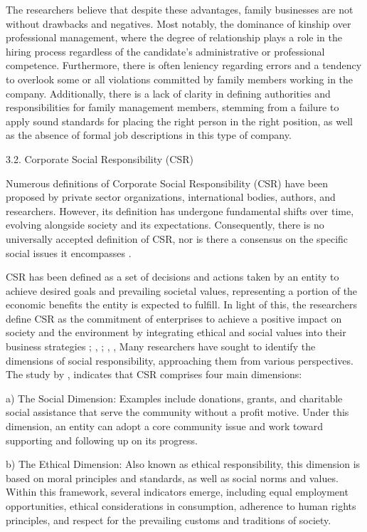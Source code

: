 \documentclass[10pt]{NSP1}
\begin{document}
The researchers believe that despite these advantages, family businesses are not without drawbacks and negatives. Most notably, the dominance of kinship over professional management, where the degree of relationship plays a role in the hiring process regardless of the candidate’s administrative or professional competence. Furthermore, there is often leniency regarding errors and a tendency to overlook some or all violations committed by family members working in the company. Additionally, there is a lack of clarity in defining authorities and responsibilities for family management members, stemming from a failure to apply sound standards for placing the right person in the right position, as well as the absence of formal job descriptions in this type of company.

3.2. Corporate Social Responsibility (CSR)

Numerous definitions of Corporate Social Responsibility (CSR) have been proposed by private sector organizations, international bodies, authors, and researchers. However, its definition has undergone fundamental shifts over time, evolving alongside society and its expectations. Consequently, there is no universally accepted definition of CSR, nor is there a consensus on the specific social issues it encompasses \cite{ref5}.

CSR has been defined as a set of decisions and actions taken by an entity to achieve desired goals and prevailing societal values, representing a portion of the economic benefits the entity is expected to fulfill. In light of this, the researchers define CSR as the commitment of enterprises to achieve a positive impact on society and the environment by integrating ethical and social values into their business strategies \cite{ref6}; \cite{ref20}, ; \cite{ref40}, \cite{ref39}, Many researchers have sought to identify the dimensions of social responsibility, approaching them from various perspectives. The study by \cite{ref25}, indicates that CSR comprises four main dimensions:

a) The Social Dimension: Examples include donations, grants, and charitable social assistance that serve the community without a profit motive. Under this dimension, an entity can adopt a core community issue and work toward supporting and following up on its progress.

b) The Ethical Dimension: Also known as ethical responsibility, this dimension is based on moral principles and standards, as well as social norms and values. Within this framework, several indicators emerge, including equal employment opportunities, ethical considerations in consumption, adherence to human rights principles, and respect for the prevailing customs and traditions of society.
\end{document}
